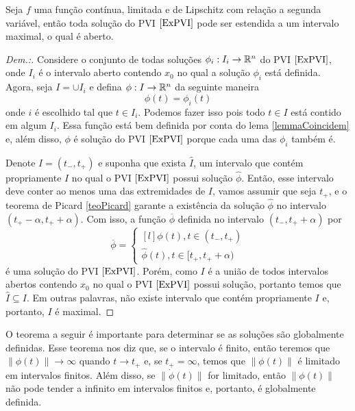 \begin{theorem}
    Seja $f$ uma função contínua, limitada e de Lipschitz com relação a segunda variável, então toda solução do PVI $\eqref{ExPVI}$ pode ser estendida a um intervalo maximal, o qual é aberto.
\end{theorem}
\begin{proof}[Dem.:]
    Considere o conjunto de todas soluções $\phi_i:I_i\to\mathbb{R}^n$ do PVI $\eqref{ExPVI}$, onde $I_i$ é o intervalo aberto contendo $x_0$ no qual a solução $\phi_i$ está definida. Agora, seja $I=\cup I_i$ e defina $\phi:I\to\mathbb{R}^n$ da seguinte maneira
    \begin{equation}
        \phi(t)=\phi_i(t)
    \end{equation}
    onde $i$ é escolhido tal que $t\in I_i$. Podemos fazer isso pois todo $t\in I$ está contido em algum $I_i$. Essa função está bem definida por conta do lema \ref{lemmaCoincidem} e, além disso, $\phi$ é solução do PVI $\eqref{ExPVI}$ porque cada uma das $\phi_i$ também é. 
    
    Denote $I=(t_-,t_+)$ e suponha que exista $\widehat{I}$, um intervalo que contém propriamente $I$ no qual o PVI $\eqref{ExPVI}$ possui solução $\widehat{\phi}$. Então, esse intervalo deve conter ao menos uma das extremidades de $I$, vamos assumir que seja $t_+$, e o teorema de Picard \ref{teoPicard} garante a existência da solução $\widehat{\phi}$ no intervalo $(t_+-\alpha,t_++\alpha)$. Com isso, a função $\overline{\phi}$ definida no intervalo $(t_-,t_++\alpha)$ por
    \begin{equation}
        \overline{\phi}=\left\{\begin{matrix*}[l]
            \phi(t),t\in(t_-,t_+)\\
            \widehat{\phi}(t),t\in[t_+,t_++\alpha)
        \end{matrix*}\right.
    \end{equation}
    é uma solução do PVI $\eqref{ExPVI}$. Porém, como $I$ é a união de todos intervalos abertos contendo $x_0$ no qual o PVI $\eqref{ExPVI}$ possui solução, portanto temos que $\widehat{I}\subseteq I$. Em outras palavras, não existe intervalo que contém propriamente $I$ e, portanto, $I$ é maximal.
\end{proof}

O teorema a seguir é importante para determinar se as soluções são globalmente definidas. Esse teorema nos diz que, se o intervalo é finito, então teremos que $\|\phi(t)\|\to\infty$ quando $t\to t_+$ e, se $t_+=\infty$, temos que $\|\phi(t)\|$ é limitado em intervalos finitos. Além disso, se $\|\dot{\phi}(t)\|$ for limitado, então $\|\phi(t)\|$ não pode tender a infinito em intervalos finitos e, portanto, é globalmente definida.

